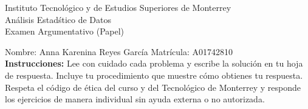 \documentclass[10pt]{report}
\begin{document}
\newpage



\begin{center}
{\large Instituto Tecnol\'{o}gico y de Estudios Superiores de Monterrey \\
An\'alisis Estad\'stico de Datos } \\
Examen Argumentativo (Papel)
\end{center}

Nombre: \underline{\hspace*{.2in}}
Anna Karenina Reyes Garc\'ia
\underline{\hspace*{.2in}} \quad Matr\'icula:\underline{\hspace*{.2in}}
A01742810
\underline{\hspace*{.2in}} \\

{\bf Instrucciones:} Lee con cuidado cada problema y escribe la soluci\'on
en tu hoja de respuesta. Incluye tu procedimiento que muestre c\'omo obtienes tu respuesta.  Respeta el c\'odigo de \'etica del curso y del Tecnol\'ogico de Monterrey y responde los ejercicios de manera individual sin ayuda externa o no autorizada.
\end{document}

